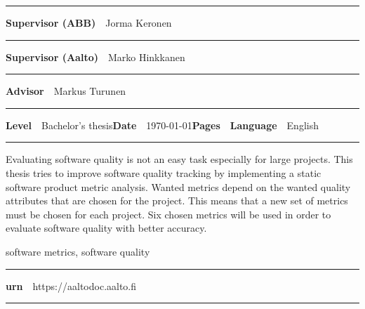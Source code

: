 \begin{spacing}{.88}
{\vspace{-2.4mm}\rule{\textwidth}{.75pt}

{\fontsize{10.5pt}{10.5pt}\bfseries\sffamily\lsstyle Supervisor (ABB)}~~{\small Jorma Keronen}

\vspace{-2.4mm}\rule{\textwidth}{.75pt}

{\fontsize{10.5pt}{10.5pt}\bfseries\sffamily\lsstyle Supervisor (Aalto)}~~{\small Marko Hinkkanen}

\vspace{-2.4mm}\rule{\textwidth}{.75pt}

{\fontsize{10.5pt}{10.5pt}\bfseries\sffamily\lsstyle Advisor}~~{\small Markus Turunen}

\vspace{-2.4mm}\rule{\textwidth}{.75pt}

{\fontsize{10.5pt}{10.5pt}\bfseries\sffamily\lsstyle Level}~~{\small Bachelor's thesis}\hfill{\fontsize{10.5pt}{10.5pt}\bfseries\sffamily\lsstyle Date}~~{\small \today}\hfill{\fontsize{10.5pt}{10.5pt}\bfseries\sffamily\lsstyle Pages}~~{\small \pageref{LastPage}}\hfill{\fontsize{10.5pt}{10.5pt}\bfseries\sffamily\lsstyle Language}~~{\small English}

\vspace{-2.4mm}\rule{\textwidth}{.75pt}

\vspace{6mm}

} %
\end{spacing}
\begin{spacing}{1.05}

\vspace{.8mm}

{\small
Evaluating software quality is not an easy task especially for large projects. This thesis tries to improve software quality tracking by implementing a static software product metric analysis. Wanted metrics depend on the wanted quality attributes that are chosen for the project. This means that a new set of metrics must be chosen for each project. Six chosen metrics will be used in order to evaluate software quality with better accuracy.
}

\vfill

\end{spacing}
\begin{spacing}{.88}
{\parindent0pt %

\parbox[t]{123.6mm}{\raggedright\small software metrics, software quality}

\vspace{.5mm}\rule{\textwidth}{.75pt}

{\fontsize{10.5pt}{10.5pt}\bfseries\sffamily\lsstyle urn}~~{\small https://aaltodoc.aalto.fi}

\vspace{-2.4mm}\rule{\textwidth}{.75pt}

} %
\end{spacing}



